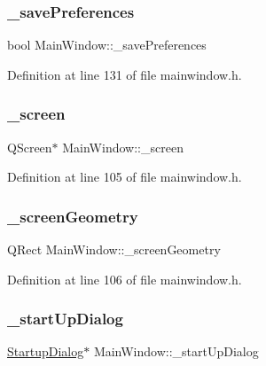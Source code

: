 \subsubsection{\texorpdfstring{\_savePreferences}{\_savePreferences}}
{\footnotesize\ttfamily bool Main\+Window\+::\+\_\+save\+Preferences\hspace{0.3cm}{\ttfamily [private]}}



Definition at line 131 of file mainwindow.\+h.

\mbox{\label{classMainWindow_aaca1bb52c5de2823d0d2ebda6a074fed}} 
\subsubsection{\texorpdfstring{\_screen}{\_screen}}
{\footnotesize\ttfamily Q\+Screen$\ast$ Main\+Window\+::\+\_\+screen\hspace{0.3cm}{\ttfamily [private]}}



Definition at line 105 of file mainwindow.\+h.

\mbox{\label{classMainWindow_a87aaa571db28f88942b781c44eac7ba5}} 
\subsubsection{\texorpdfstring{\_screenGeometry}{\_screenGeometry}}
{\footnotesize\ttfamily Q\+Rect Main\+Window\+::\+\_\+screen\+Geometry\hspace{0.3cm}{\ttfamily [private]}}



Definition at line 106 of file mainwindow.\+h.

\mbox{\label{classMainWindow_a850dd2c4a3175dffc1ca0aff45f90df2}} 
\subsubsection{\texorpdfstring{\_startUpDialog}{\_startUpDialog}}
{\footnotesize\ttfamily \mbox{\hyperlink{classStartupDialog}{Startup\+Dialog}}$\ast$ Main\+Window\+::\+\_\+start\+Up\+Dialog\hspace{0.3cm}{\ttfamily [private]}}



